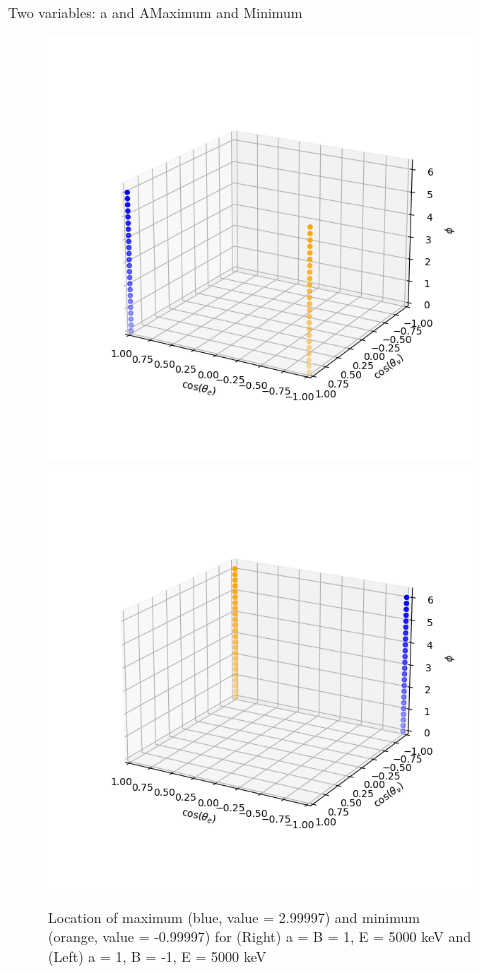 \documentclass{beamer}
\begin{document}
\begin{frame}{Two variables: a and A}{Maximum and Minimum}
	\begin{figure}
		\centering
		\includegraphics[width=0.4\paperwidth]{plots/posa_eqposA_max_min}
		\includegraphics[width=0.4\paperwidth]{plots/posa_eqnegA_max_min}
		\caption{Location of maximum (blue, value = 2.99997) and minimum (orange, value = -0.99997) for (Right) a = B = 1, E = 5000 keV and (Left) a = 1, B = -1, E = 5000 keV}
	\end{figure}
\end{frame}
\end{document}
